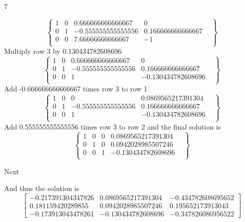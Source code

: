 \documentclass{exercises}
\begin{document}
\begin{exr}{}{7}
\begin{enumerate}
\begin{equation}
\left\{
    \begin{array}{ccc|cl}1&0&0.666666666666667&0&\\0&1&-0.555555555555556&0.166666666666667&\\0&0&7.66666666666667&-1&\\\end{array}
\right\}
\end{equation}Multiply row 3 by 0.130434782608696
\begin{equation}
\left\{
    \begin{array}{ccc|cl}1&0&0.666666666666667&0&\\0&1&-0.555555555555556&0.166666666666667&\\0&0&1&-0.130434782608696&\\\end{array}
\right\}
\end{equation}Add -0.666666666666667 times row 3 to row 1
\begin{equation}
\left\{
    \begin{array}{ccc|cl}1&0&0&0.0869565217391304&\\0&1&-0.555555555555556&0.166666666666667&\\0&0&1&-0.130434782608696&\\\end{array}
\right\}
\end{equation}Add 0.555555555555556 times row 3 to row 2
and the final solution is
\begin{equation}
\left\{
    \begin{array}{ccc|cl}1&0&0&0.0869565217391304&\\0&1&0&0.0942028985507246&\\0&0&1&-0.130434782608696&\\\end{array}
\right\}
\end{equation}


Next

And thus the solution is 
\begin{equation}
\begin{bmatrix}
	-0.217391304347826 &  0.0869565217391304  &  -0.434782608695652 \\
0.181159420289855 &  0.0942028985507246  & 0.195652173913043 \\
-0.173913043478261 &  -0.130434782608696  & -0.347826086956522
\end{bmatrix}
\end{equation}




\end{enumerate}
\end{exr}
\end{document}
